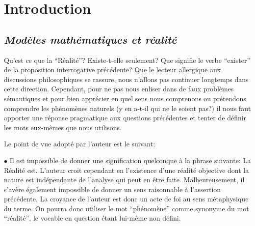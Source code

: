 
\chapter*{Introduction}
\section*{\sl Mod\`eles math\'ematiques et r\'ealit\'e}

Qu'est ce que la ``R\'ealit\'e''? Existe-t-elle seulement? Que
signifie le verbe ``exister'' de la proposition
interrogative pr\'ec\'edente? Que le lecteur allergique aux
discussions philosophiques se rassure, nous n'allons pas
continuer longtemps dans cette direction. Cependant, pour
ne pas nous enliser dans de faux probl\`emes s\'emantiques et
pour bien appr\'ecier en quel sens nous comprenons ou
pr\'etendons comprendre les ph\'enom\`enes naturels (y en a-t-il
qui ne le soient pas?) il nous faut apporter une r\'eponse
pragmatique aux questions pr\'ec\'edentes et tenter de d\'efinir
les mots eux-m\^emes que nous utilisons.\par
Le point de vue adopt\'e par l'auteur est le
suivant:\par

$\bullet$ Il est impossible de donner une signification
quelconque \`a la phrase suivante: La R\'ealit\'e est.
L'auteur croit cependant en l'existence d'une r\'ealit\'e
objective dont la nature est ind\'ependante de l'analyse
qui peut en \^etre faite. Malheureusement, il s'av\`ere
\'egalement impossible de donner un sens raisonnable \`a
l'assertion pr\'ec\'edente. La croyance de l'auteur est donc
un acte de foi au sens m\'etaphysique du terme. On pourra
donc utiliser le mot ``ph\'enom\`ene'' comme
synonyme du mot ``r\'ealit\'e'', le vocable en question \'etant
lui-m\^eme non d\'efini. \par

